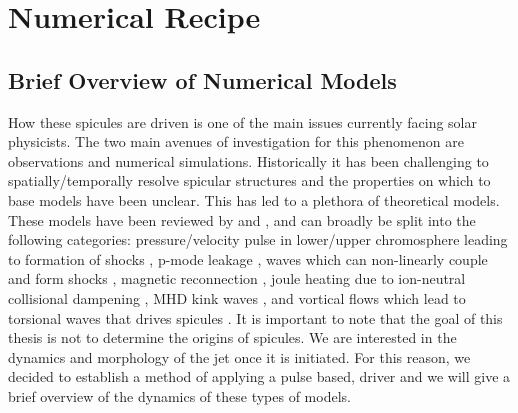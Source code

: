 \chapter{Numerical Recipe}
\label{chap:Numerical_Recipe}
\section{Brief Overview of Numerical Models}
\label{sec:models}
How these spicules are driven is one of the main issues currently facing solar physicists. The two main avenues of investigation for this phenomenon are observations and numerical simulations. Historically it has been challenging to spatially/temporally resolve spicular structures and the properties on which to base models have been unclear. This has led to a plethora of theoretical models. These models have been reviewed by \cite{Sterling_2000SoPh} and \cite{Aschwanden2019ASSL}, and can broadly be split into the following categories: pressure/velocity pulse in lower/upper chromosphere leading to formation of shocks \citep{Shibata1982,Suematsu1982SoPh7599S,Hollweg1982ApJ257345H,Sterling1990ApJ349647S,Heggland2007ApJ6661277H,kuzma2017ApJ84978K}, p-mode leakage \citep{Pontieu2004Natur},  \Alfven waves which can non-linearly couple and form shocks \citep{Hollweg1982SoPh7535H,Hollweg1992ApJ389731H, Kudoh1999ApJ514493K, Matsumoto2010ApJ7101857M}, magnetic reconnection \citep{Yokoyama1995Natur37542Y,Yokoyama1996PASJ48353Y, Archontis2005ApJ6351299A, Pontieu2007PASJ,Isobe2008ApJ679L57I,Nishizuka2008ApJ683L83N,Sterling2010ApJ,Gonz2017ApJ,Gonz2018arXiv180704224G,Gonz2018ApJ856176G}, joule heating due to ion-neutral collisional dampening \citep{Haerendel1992Natur360241H,James2003AA}, MHD kink waves \citep{Kukhianidze2006AA}, and vortical flows which lead to torsional \Alfven waves that drives spicules \citep{Iijima2017ApJ,Samanta2019Sci}. \np
%
It is important to note that the goal of this thesis is not to determine the origins of spicules. We are interested in the dynamics and morphology of the jet once it is initiated. For this reason, we decided to establish a method of applying a pulse based, driver and we will give a brief overview of the dynamics of these types of models. 
